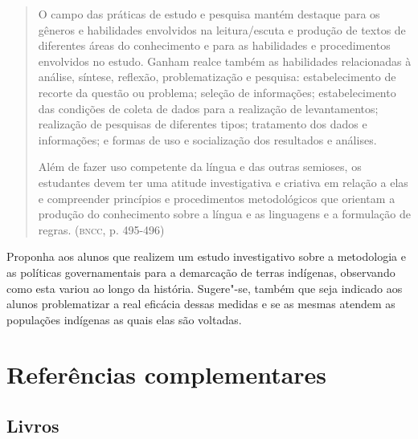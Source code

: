 \documentclass[12pt]{extarticle}
\begin{document}
\begin{quote}
O campo das práticas de estudo e pesquisa mantém destaque para os
gêneros e habilidades envolvidos na leitura/escuta e produção de textos
de diferentes áreas do conhecimento e para as habilidades e
procedimentos envolvidos no estudo. Ganham realce também as habilidades
relacionadas à análise, síntese, reflexão, problematização e pesquisa:
estabelecimento de recorte da questão ou problema; seleção de
informações; estabelecimento das condições de coleta de dados para a
realização de levantamentos; realização de pesquisas de diferentes
tipos; tratamento dos dados e informações; e formas de uso e
socialização dos resultados e análises.

Além de fazer uso competente da língua e das outras semioses, os
estudantes devem ter uma atitude investigativa e criativa em relação a
elas e compreender princípios e procedimentos metodológicos que orientam
a produção do conhecimento sobre a língua e as linguagens e a formulação
de regras. (\textsc{bncc}, p. 495-496)
\end{quote}

Proponha aos alunos que realizem um estudo investigativo sobre a
metodologia e as políticas governamentais para a demarcação de terras
indígenas, observando como esta variou ao longo da história.
Sugere"-se, também que seja indicado aos alunos problematizar a real
eficácia dessas medidas e se as mesmas atendem as populações indígenas
as quais elas são voltadas.

\section{Referências complementares}

\subsection{Livros}
\end{document}

